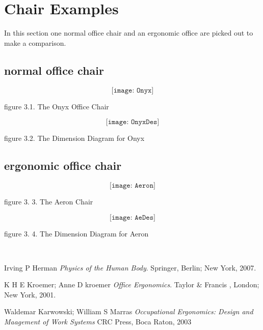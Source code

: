 \documentclass[paper=a4, fontsize=12pt, ]{scrartcl} %
\numberwithin{equation}{section} %
\numberwithin{figure}{section} %
\numberwithin{table}{section} %
\begin{document}

\section{Chair Examples}
In this section one normal office chair and an ergonomic office are picked out to make a comparison.
\subsection{normal office chair}
\vspace{1 cm}
$$\texttt{[image: Onyx]}$$
\begin{footnotesize}
figure 3.1. The Onyx Office Chair
\end{footnotesize}
\vspace{1 cm}
$$\texttt{[image: OnyxDes]}$$
\begin{footnotesize}
figure 3.2. The Dimension Diagram for Onyx
\end{footnotesize}

\subsection{ergonomic office chair}
\vspace{1 cm}
$$\texttt{[image: Aeron]}$$
\begin{footnotesize}
figure 3. 3. The Aeron Chair
\end{footnotesize}
\vspace{1 cm}
$$\texttt{[image: AeDes]}$$
\begin{footnotesize}
figure 3. 4. The Dimension Diagram for Aeron
\end{footnotesize}
\\

\begin{thebibliography}{9}
Irving P Herman
\textit{Physics of the Human Body}.
Springer, Berlin; New York, 2007.

K H E Kroemer; Anne D kroemer
\textit{Office Ergonomics}.
Taylor \& Francis , London; New York, 2001.

Waldemar Karwowski; William S Marras
\textit{Occupational Ergonomics: Design and Maagement of Work Systems}
CRC Press, Boca Raton, 2003

\end{thebibliography}
\end{document}
